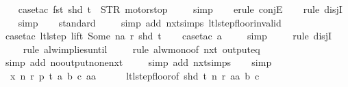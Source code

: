 \begin{isabellebody}
\ \ \isamarkupfalse%
\ {\isacharparenleft}case{\isacharunderscore}tac\ {\isachardoublequoteopen}fst\ {\isacharparenleft}shd\ t{\isacharparenright}\ {\isacharequal}\ STR\ {\isacharprime}{\isacharprime}motorstop{\isacharprime}{\isacharprime}{\isachardoublequoteclose}{\isacharparenright}\isanewline
\ \ \ \isamarkupfalse%
\ simp\isanewline
\ \ \isamarkupfalse%
\ {\isacharparenleft}erule\ conjE{\isacharparenright}\isanewline
\ \ \isamarkupfalse%
\ {\isacharparenleft}rule\ disjI{}{\isacharparenright}\isanewline
\ \ \isamarkupfalse%
\ simp\isanewline
\ \ \isamarkupfalse%
\ standard\isanewline
\ \ \ \isamarkupfalse%
\ {\isacharparenleft}simp\ add{\isacharcolon}\ nxt{\isachardot}simps\ ltl{\isacharunderscore}step{\isacharunderscore}floor{\isacharunderscore}invalid{\isacharparenright}\isanewline
\ \ \isamarkupfalse%
\ {\isacharparenleft}case{\isacharunderscore}tac\ {\isachardoublequoteopen}ltl{\isacharunderscore}step\ lift\ {\isacharparenleft}Some\ na{\isacharparenright}\ r\ {\isacharparenleft}shd\ t{\isacharparenright}{\isachardoublequoteclose}{\isacharparenright}\isanewline
\ \ \isamarkupfalse%
\ {\isacharparenleft}case{\isacharunderscore}tac\ a{\isacharparenright}\isanewline
\ \ \ \isamarkupfalse%
\ simp\isanewline
\ \ \ \isamarkupfalse%
\ {\isacharparenleft}rule\ disjI{}{\isacharparenright}\isanewline
\ \ \ \isamarkupfalse%
\ {\isacharparenleft}rule\ alw{\isacharunderscore}implies{\isacharunderscore}until{\isacharparenright}\isanewline
\ \ \ \isamarkupfalse%
\ {\isacharparenleft}rule\ alw{\isacharunderscore}mono{\isacharbrackleft}of\ {\isachardoublequoteopen}nxt\ {\isacharparenleft}output{\isacharunderscore}eq\ {\isacharbrackleft}{\isacharbrackright}{\isacharparenright}{\isachardoublequoteclose}{\isacharbrackright}{\isacharparenright}\isanewline
\ \ \ \ \isamarkupfalse%
\ {\isacharparenleft}simp\ add{\isacharcolon}\ no{\isacharunderscore}output{\isacharunderscore}none{\isacharunderscore}nxt{\isacharparenright}\isanewline
\ \ \ \isamarkupfalse%
\ {\isacharparenleft}simp\ add{\isacharcolon}\ nxt{\isachardot}simps{\isacharparenright}\isanewline
\ \ \isamarkupfalse%
\ simp\isanewline
\ \ \isamarkupfalse%
\ \ x\ n\ r\ p\ t\ a\ b\ c\ aa\isanewline
\ \ \ \ \isamarkupfalse%
\ ltl{\isacharunderscore}step{\isacharunderscore}floor{\isacharbrackleft}of\ {\isachardoublequoteopen}shd\ t{\isachardoublequoteclose}\ n\ r\ aa\ b\ c{\isacharbrackright}\isanewline

\end{isabellebody}

